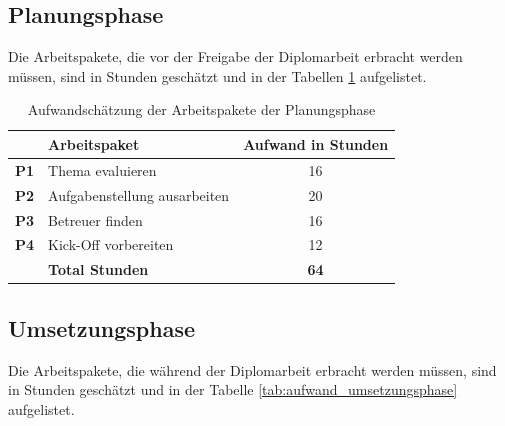\subsection{Planungsphase}
Die Arbeitspakete, die vor der Freigabe der Diplomarbeit erbracht werden müssen,
sind in Stunden geschätzt und in der Tabellen \ref{tab:auwand_planungsphase} 
aufgelistet.

\begin{table}[h]
\begin{center}
    \begin{tabular}{llc}
        \toprule & \textbf{Arbeitspaket} & \textbf{Aufwand in Stunden} \\
        \midrule \textbf{P1} & Thema evaluieren & 16 \\
        \midrule \textbf{P2} & Aufgabenstellung ausarbeiten & 20 \\
        \midrule \textbf{P3} & Betreuer finden & 16 \\
        \midrule \textbf{P4} & Kick-Off vorbereiten & 12 \\
        \bottomrule & \textbf{Total Stunden} & \textbf{64} \\
        \bottomrule
    \end{tabular}
    \caption{Aufwandschätzung der Arbeitspakete der Planungsphase}
    \label{tab:auwand_planungsphase}
\end{center}
\end{table}

\subsection{Umsetzungsphase}
Die Arbeitspakete, die während der Diplomarbeit erbracht werden müssen, sind
in Stunden geschätzt und in der Tabelle \ref{tab:aufwand_umsetzungsphase}
aufgelistet.

